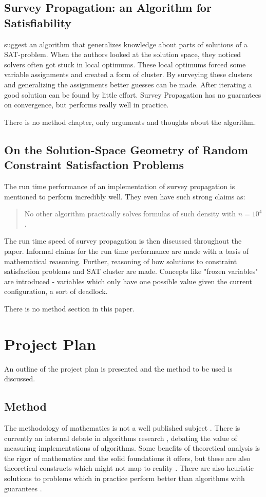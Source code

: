 \documentclass[msc,lith,english]{liuthesis}
\begin{document}
\section{Survey Propagation: an Algorithm for Satisfiability}
\citeauthor{sourceSurveyProp} \cite{sourceSurveyProp} suggest an algorithm that generalizes knowledge about parts of solutions of a SAT-problem. 
When the authors looked at the solution space, they noticed solvers often got stuck in local optimums.
These local optimums forced some variable assignments and created a form of cluster.
By surveying these clusters and generalizing the assignments better guesses can be made.
After iterating a good solution can be found by little effort.
Survey Propagation has no guarantees on convergence, but performs really well in practice.

There is no method chapter, only arguments and thoughts about the algorithm.

\section{On the Solution-Space Geometry of Random Constraint Satisfaction Problems}
The run time performance of an implementation of survey propagation is mentioned to perform incredibly well.
They even have such strong claims as:
\blockquote{No other algorithm practically solves formulas of such density with $n=10^4$.}
\cite{sourceSolutionSpace}

The run time speed of survey propagation is then discussed throughout the paper.
Informal claims for the run time performance are made with a basis of mathematical reasoning.
Further, reasoning of how solutions to constraint satisfaction problems and SAT cluster are made.
Concepts like "frozen variables" are introduced - variables which only have one
possible value given the current configuration, a sort of deadlock.

There is no method section in this paper.

\chapter{Project Plan}
An outline of the project plan is presented and the method to be used is discussed.

\section{Method}
The methodology of mathematics is not a well published subject \cite{sourceMethodMath}.
There is currently an internal debate in algorithms research \cite{sourceUllman}, debating the value of measuring implementations of algorithms.
Some benefits of theoretical analysis is the rigor of mathematics and the solid foundations it offers, but these are also theoretical constructs which might not map to reality \cite{sourceAlgorithmEngineeering}.
There are also heuristic solutions to problems which in practice perform better than algorithms with guarantees \cite{sourceSolutionSpace}\cite{sourceSurveyProp}.
\end{document}
